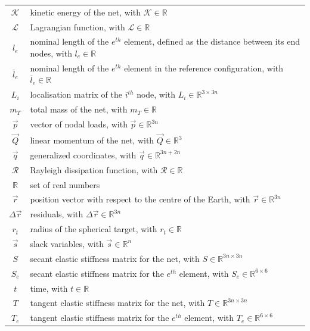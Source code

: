 \begin{tabular}{cp{}}
  $ \mathcal{K} $ & kinetic energy of the net, with $\mathcal{K} \in \mathbb{R}$ \\
  $ \mathcal{L} $ & Lagrangian function, with $\mathcal{L} \in \mathbb{R}$ \\  
  $ l_e $ & nominal length of the $e^{th}$ element, defined as the distance between its end nodes, with $l_e \in \mathbb{R}$ \\
  $ \bar{l}_e $ & nominal length of the $e^{th}$ element in the reference configuration, with $\bar{l}_e \in \mathbb{R}$ \\
  $ L_i $ & localisation matrix of the $i^{th}$ node, with $ L_i \in \mathbb{R}^{3 \times 3n} $ \\
  $ m_T $ & total mass of the net, with $m_T \in \mathbb{R}$ \\
  $\vec{p}$ & vector of nodal loads, with $ \vec{p} \in \mathbb{R}^{3n}$ \\
  $ \vec{Q} $ & linear momentum of the net, with $ \vec{Q} \in \mathbb{R}^{3} $ \\
  $ \vec{q} $ & generalized coordinates, with $ \vec{q} \in \mathbb{R}^{3n + 2n} $ \\
  $\mathcal{R}$ & Rayleigh dissipation function, with $\mathcal{R} \in \mathbb{R}$ \\
  $\mathbb{R}$ & set of real numbers \\
  $\vec{r}$ & position vector with respect to the centre of the Earth, with $ \vec{r} \in \mathbb{R}^{3n}$ \\
  $\Delta \vec{r}$ & residuals, with $ \Delta \vec{r} \in \mathbb{R}^{3n}$ \\
  $r_t$ & radius of the spherical target, with $r_t \in \mathbb{R} $ \\
  $ \vec{s} $ & slack variables, with $ \vec{s} \in \mathbb{R}^{n} $ \\
  $ S $ & secant elastic stiffness matrix for the net, with $ S \in \mathbb{R}^{3n \times 3n} $ \\
  $ S_e $ & secant elastic stiffness matrix for the $e^{th}$ element, with $ S_e \in \mathbb{R}^{6 \times 6} $ \\
  $t$ & time, with $t \in \mathbb{R} $ \\
  $ T $ & tangent elastic stiffness matrix for the net, with $ T \in \mathbb{R}^{3n \times 3n} $ \\
  $ T_e $ & tangent elastic stiffness matrix for the $e^{th}$ element, with $ T_e \in \mathbb{R}^{6 \times 6} $ \\
\end{tabular}\\

